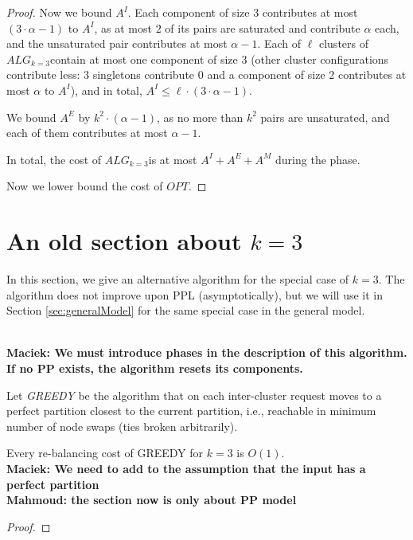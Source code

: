\documentclass[manuscript,screen=true]{acmart}
\newcommand{\OPT}{\mathit{OPT}}
\newcommand{\TAlg}{{\ensuremath{ALG_{k=3}}}} %
\newcommand\mahmoud[1]{\color{green}\textbf{\\ Mahmoud: #1}\\\color{black}}
\newcommand\maciek[1]{\color{brown}\textbf{\\ Maciek: #1}\color{black}}
\begin{document}
\begin{appendix}
\begin{proof}
    Now we bound $A^I$.
    Each component of size $3$ contributes at most $(3\cdot \alpha - 1)$ to $A^I$, as at most $2$ of its pairs are saturated and contribute $\alpha$ each, and the unsaturated pair contributes at most $\alpha-1$.
    Each of $\ell$ clusters of \TAlg contain at most one component of size $3$ (other cluster configurations contribute less: $3$ singletons contribute $0$ and a component of size $2$ contributes at most $\alpha$ to $A^I$), and in total, $A^I \leq \ell \cdot (3\cdot \alpha-1)$.

    We bound $A^E$ by $k^2 \cdot (\alpha - 1)$, as no more than $k^2$ pairs are unsaturated, and each of them contributes at most $\alpha -1$.

    In total, the cost of \TAlg is at most $A^I + A^E + A^M$ during the phase.

    Now we lower bound the cost of $\OPT$.
  \end{proof}
  

  \section{An old section about $k=3$}

  \label{sec:k3}
  In this section,
  we give an alternative algorithm for the special case of $k=3$.
  The algorithm does not  improve upon PPL (asymptotically),
  but we will use it in Section \ref{sec:generalModel} for the same special case in the general model.
  
  \maciek{We must introduce phases in the description of this algorithm. If no PP exists, the algorithm resets its components.}
  
  Let \emph{GREEDY} be the algorithm that on each inter-cluster request
   moves to a perfect partition
  closest to the current partition,
  i.e.,
  reachable in minimum number of node swaps (ties broken arbitrarily).
  
  \begin{lemma} \label{lemma:k=3}
    Every re-balancing cost of GREEDY for $k=3$ is $O(1)$.
    \maciek{We need to add to the assumption that the input has a perfect partition
    \mahmoud{the section now is only about PP model}}
    \label{rebalancing-cost}
  \end{lemma}
  
  \begin{proof} 
  

\end{proof}
\end{appendix}
\end{document}
